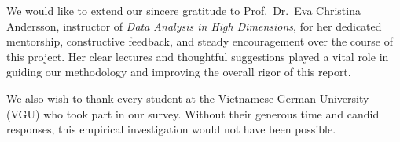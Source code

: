 \documentclass[11pt,a4paper]{article}
\begin{document}
\noindent
We would like to extend our sincere gratitude to Prof.\ Dr.\ Eva Christina Andersson, instructor of \textit{Data Analysis in High Dimensions}, for her dedicated mentorship, constructive feedback, and steady encouragement over the course of this project. Her clear lectures and thoughtful suggestions played a vital role in guiding our methodology and improving the overall rigor of this report.

\vspace{0.8em}
\noindent
We also wish to thank every student at the Vietnamese-German University (VGU) who took part in our survey. Without their generous time and candid responses, this empirical investigation would not have been possible.

\newpage

\tableofcontents
\newpage

\listoffigures
\newpage

\listoftables
\newpage

\end{document}
